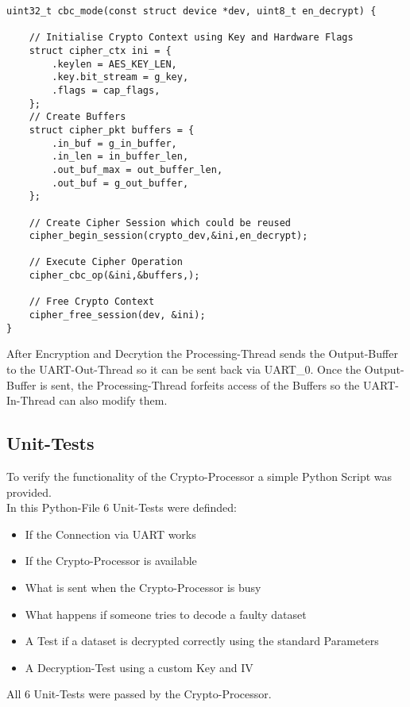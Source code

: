 \begin{lstlisting}[style=CStyle,caption=Encryption and Decryption Pseudo-Code]
uint32_t cbc_mode(const struct device *dev, uint8_t en_decrypt) {

	// Initialise Crypto Context using Key and Hardware Flags
	struct cipher_ctx ini = {
		.keylen = AES_KEY_LEN,
		.key.bit_stream = g_key,
		.flags = cap_flags,
	};
	// Create Buffers
	struct cipher_pkt buffers = {
		.in_buf = g_in_buffer,
		.in_len = in_buffer_len,
		.out_buf_max = out_buffer_len,
		.out_buf = g_out_buffer,
	};

	// Create Cipher Session which could be reused
	cipher_begin_session(crypto_dev,&ini,en_decrypt);

	// Execute Cipher Operation
	cipher_cbc_op(&ini,&buffers,);

	// Free Crypto Context
	cipher_free_session(dev, &ini);
}
\end{lstlisting}

After Encryption and Decrytion the Processing-Thread sends the Output-Buffer
to the UART-Out-Thread so it can be sent back via UART\_0.
Once the Output-Buffer is sent, the Processing-Thread forfeits access of
the Buffers so the UART-In-Thread can also modify them.

\pagebreak

\subsection{Unit-Tests}

To verify the functionality of the Crypto-Processor a simple Python Script
was provided.
\\
In this Python-File 6 Unit-Tests were definded:

\begin{itemize}
	\item If the Connection via UART works
	\item If the Crypto-Processor is available
	\item What is sent when the Crypto-Processor is busy
	\item What happens if someone tries to decode a faulty dataset
	\item A Test if a dataset is decrypted correctly using the standard Parameters
	\item A Decryption-Test using a custom Key and IV
\end{itemize}

All 6 Unit-Tests were passed by the Crypto-Processor.
